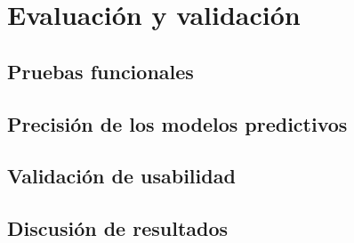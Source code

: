 \chapter{Evaluación y validación}
\label{ch:evaluacion}


\section{Pruebas funcionales}
\label{sec:pruebas_funcionales}

\section{Precisión de los modelos predictivos}
\label{sec:precision}

\section{Validación de usabilidad}
\label{sec:usabilidad}

\section{Discusión de resultados}
\label{sec:discusion}
